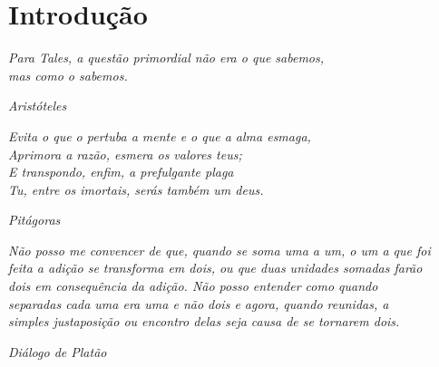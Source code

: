 
 \setcounter{page}{6} \thispagestyle{empty}
\chapter*{\textbf{\LARGE{Introdução}}}


\vspace{2cm}

\begin{center}
\textit{Para Tales, a questão primordial não era o que sabemos,\\ mas como o sabemos.}
\end{center}

\begin{flushright}
\textsl{Aristóteles}
\end{flushright}

\begin{center}
\textit{Evita o que o pertuba a mente e o que a alma esmaga,\\ Aprimora a razão, esmera os valores teus;\\ E transpondo, enfim, a prefulgante plaga\\
Tu, entre os imortais, serás também um deus.}
\end{center}

\begin{flushright}
\textsl{Pitágoras}
\end{flushright}

\begin{center}
\textit{Não posso me convencer de que, quando se soma uma a um, o um a que foi\\
feita a adição se transforma em dois, ou que duas unidades somadas farão\\ dois em consequência da adição. Não posso entender como quando\\
separadas cada uma era uma e não dois e agora, quando reunidas, a\\ simples justaposição ou encontro delas seja causa de se tornarem dois.}
\end{center}

\begin{flushright}
\textsl{Diálogo de Platão}
\end{flushright}

